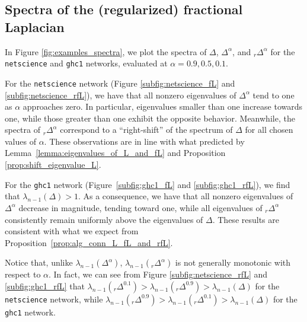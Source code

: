 \documentclass[a4paper,12pt]{article}
\newcommand{\fL}{\Delta^\alpha}
\newcommand{\rfL}{{}_r\fL}
\begin{document}
\subsection{Spectra of the (regularized) fractional Laplacian}


In Figure \ref{fig:examples_spectra}, we plot the spectra of $\Delta$, $\fL$, and $\rfL$ for the \texttt{netscience} and \texttt{ghc1} networks, evaluated at $\alpha = 0.9, 0.5, 0.1$.

For the \texttt{netscience} network (Figure \ref{subfig:netscience_fL} and \ref{subfig:netscience_rfL}), we have that all nonzero eigenvalues of $\fL$ tend to one as $\alpha$ approaches zero. In particular, eigenvalues smaller than one increase towards one, while those greater than one exhibit the opposite behavior. Meanwhile, the spectra of $\rfL$ correspond to a ``right-shift'' of the spectrum of $\Delta$ for all chosen values of $\alpha$. These observations are in line with what predicted by Lemma~\ref{lemma:eigenvalues_of_L_and_fL} and Proposition \ref{prop:shift_eigenvalue_L}.  

For the \texttt{ghc1} network (Figure~\ref{subfig:ghc1_fL} and \ref{subfig:ghc1_rfL}), we find that $\lambda_{n-1}(\Delta)>1$. As a consequence, we have that all nonzero eigenvalues of $\fL$ decrease in magnitude, tending toward one, while all eigenvalues of $\rfL$ consistently remain uniformly above the eigenvalues of $\Delta$. These results are consistent with what we expect from Proposition~\ref{prop:alg_conn_L_fL_and_rfL}. 

Notice that, unlike $\lambda_{n-1}(\Delta^{\alpha})$, $\lambda_{n-1}({}_r\Delta^{\alpha})$ is not generally monotonic with respect to $\alpha$. In fact, we can see from Figure \ref{subfig:netscience_rfL} and \ref{subfig:ghc1_rfL} that $\lambda_{n-1}({}_r\Delta^{0.1})>\lambda_{n-1}({}_r\Delta^{0.9})>\lambda_{n-1}(\Delta)$ for the \texttt{netscience} network, while $\lambda_{n-1}({}_r\Delta^{0.9})>\lambda_{n-1}({}_r\Delta^{0.1})>\lambda_{n-1}(\Delta)$ for the \texttt{ghc1} network. 
\end{document}
